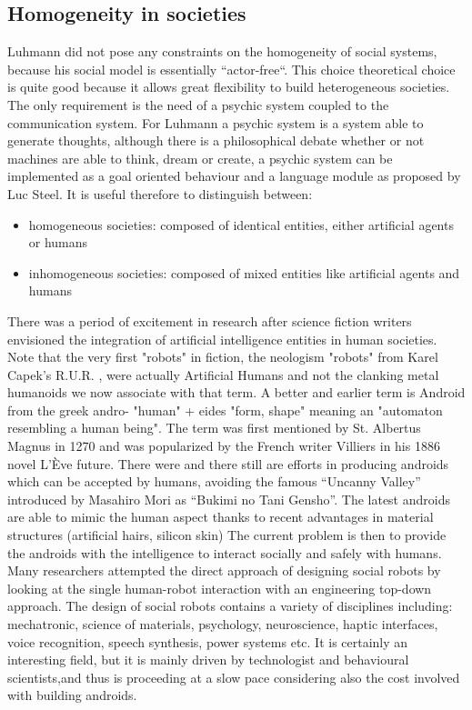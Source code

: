 \subsection{Homogeneity in societies}
Luhmann did not pose any constraints on the homogeneity of social systems,
because his social model is essentially ``actor-free``.
This choice theoretical choice is quite good because it allows great flexibility
to build heterogeneous societies.
The only requirement is the need of a psychic system coupled to the communication
system.
For Luhmann a psychic system is a system able to generate thoughts, although there 
is a philosophical debate whether or not machines are able to 
think, dream or create, a psychic system can be implemented as a goal oriented behaviour
and a language module as proposed by Luc Steel.
It is useful therefore to distinguish between:
\begin{itemize}
 \item homogeneous societies: composed of identical entities, either artificial agents or humans
 \item inhomogeneous societies: composed of mixed entities like artificial agents and humans
\end{itemize}
There was a period of excitement in research after science fiction writers envisioned
 the integration of artificial intelligence entities in human societies.
Note that the very first "robots" in fiction, the neologism "robots" from Karel
Capek's R.U.R. \citep{Karel1920:RUR}, were actually Artificial Humans
 and not the clanking metal humanoids we now associate with that term.
A better and earlier term is Android from the greek andro- "human" + eides "form,
shape" meaning an "automaton resembling a human being". The term was first
mentioned by St. Albertus Magnus in 1270 and was popularized by the French writer
 Villiers in his 1886 novel L'Ève future.
There were and there still are efforts in producing androids which can be accepted
 by humans, avoiding the famous ``Uncanny Valley'' introduced by
Masahiro Mori as ``Bukimi no Tani Gensho''.
The latest androids are able to mimic the human aspect thanks to recent
advantages in material structures (artificial hairs, silicon skin)
The current problem is then to provide the androids with the intelligence to
interact socially and safely with humans.
Many researchers attempted the direct approach of designing social robots by
looking at the single human-robot interaction with an engineering top-down approach.
The design of social robots contains a variety of disciplines including:
mechatronic, science of materials, psychology, neuroscience, haptic interfaces,
voice recognition, speech synthesis, power systems etc.
It is certainly an interesting field, but it is mainly driven by technologist
and behavioural scientists,and thus is proceeding at a slow pace considering 
also the cost involved with building androids.

